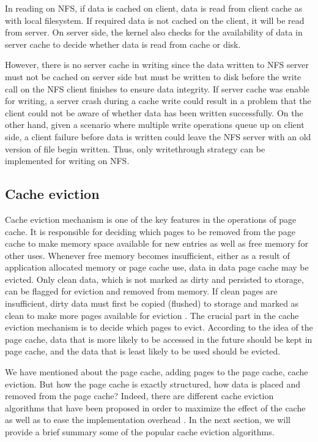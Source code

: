 In reading on NFS, if data is cached on client, data is read from client cache 
as with local filesystem. If required data is not cached on the client, 
it will be read from server. On server side, the kernel also checks for the 
availability of data in server cache to decide whether data is read from 
cache or disk. 

However, there is no server cache in writing since the data written to 
NFS server must not be cached on server side but must be written to 
disk before the write call on the NFS client finishes to ensure data integrity. 
If server cache was enable for writing, a server crash during a cache 
write could result in a problem that the client could not be aware of whether 
data has been written successfully. 
On the other hand, given a scenario where multiple write operations 
queue up on client side, a client failure before data is written could leave 
the NFS server with an old version of file begin written. 
Thus, only writethrough strategy can be implemented for writing on NFS. 

\subsection{Cache eviction}

Cache eviction mechanism is one of the key features in the operations of 
page cache. 
It is responsible for deciding which pages to be removed from the 
page cache to make memory space available for new entries as well as 
free memory for other uses. 
Whenever free memory becomes insufficient, either as a result of application 
allocated memory or page cache use, data in data page cache may be evicted. 
Only clean data, which is not marked as dirty and persisted to storage, 
can be flagged for eviction and removed from memory. 
If clean pages are insufficient, dirty data must first be copied (flushed) 
to storage and marked as clean to make more pages available for eviction 
\cite{linuxdev3rd2010,bovet2005understanding}. 
The crucial part in the cache eviction mechanism is to decide which pages 
to evict. According to the idea of the page cache, data that is more likely 
to be accessed in the future should be kept in page cache, and the data 
that is least likely to be used should be evicted. 

We have mentioned about the page cache, adding pages to the page cache, 
cache eviction. But how the page cache is exactly structured, how data is 
placed and removed from the page cache?
Indeed, there are different cache eviction algorithms that have been 
proposed in order to maximize the effect of the cache as well as to 
ease the implementation overhead \cite{chavan2011comparison}.
In the next section, we will provide a brief summary some of the popular 
cache eviction algorithms.


